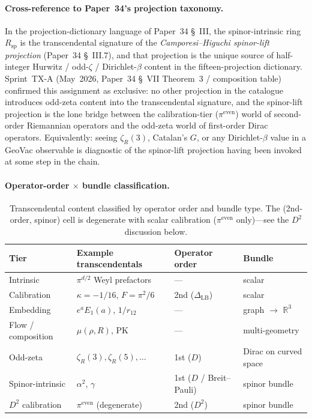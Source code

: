 \documentclass[aps,pra,twocolumn,superscriptaddress,longbibliography]{revtex4-2}
\begin{document}
\paragraph{Cross-reference to Paper~34's projection taxonomy.}
In the projection-dictionary language of Paper~34 \S~III, the
spinor-intrinsic ring $R_\mathrm{sp}$ is the transcendental signature
of the \emph{Camporesi--Higuchi spinor-lift projection} (Paper~34
\S~III.7), and that projection is the unique source of half-integer
Hurwitz / odd-$\zeta$ / Dirichlet-$\beta$ content in the
fifteen-projection dictionary.  Sprint~TX-A (May~2026, Paper~34
\S~VII Theorem~3 / composition table) confirmed this assignment as
exclusive: no other projection in the catalogue introduces odd-zeta
content into the transcendental signature, and the spinor-lift
projection is the lone bridge between the calibration-tier
($\pi^{\text{even}}$) world of second-order Riemannian operators and
the odd-zeta world of first-order Dirac operators.  Equivalently:
seeing $\zeta_R(3)$, Catalan's $G$, or any Dirichlet-$\beta$ value in
a GeoVac observable is diagnostic of the spinor-lift projection
having been invoked at some step in the chain.


\paragraph{Operator-order $\times$ bundle classification.}

\begin{table}[h]
\caption{Transcendental content classified by operator order and bundle
  type.  The (2nd-order, spinor) cell is degenerate with scalar
  calibration ($\pi^{\mathrm{even}}$ only)---see the $D^2$ discussion
  below.}
\label{tab:bundle_operator_tiers}
\begin{ruledtabular}
\begin{tabular}{llll}
  Tier & Example transcendentals & Operator order & Bundle \\
  \hline
  Intrinsic         & $\pi^{d/2}$ Weyl prefactors & --- & scalar \\
  Calibration       & $\kappa = -1/16$, $F = \pi^2/6$
                    & 2nd ($\Delta_{\text{LB}}$)
                    & scalar \\
  Embedding         & $e^a E_1(a)$, $1/r_{12}$
                    & ---
                    & graph $\to$ $\mathbb{R}^3$ \\
  Flow / composition & $\mu(\rho,R)$, PK
                    & ---
                    & multi-geometry \\
  Odd-zeta          & $\zeta_R(3), \zeta_R(5), \dots$
                    & 1st ($D$)
                    & Dirac on curved space \\
  Spinor-intrinsic  & $\alpha^2$, $\gamma$
                    & 1st ($D$ / Breit--Pauli)
                    & spinor bundle \\
  $D^2$ calibration & $\pi^{\text{even}}$ (degenerate)
                    & 2nd ($D^2$)
                    & spinor bundle \\
\end{tabular}
\end{ruledtabular}
\end{table}
\end{document}
